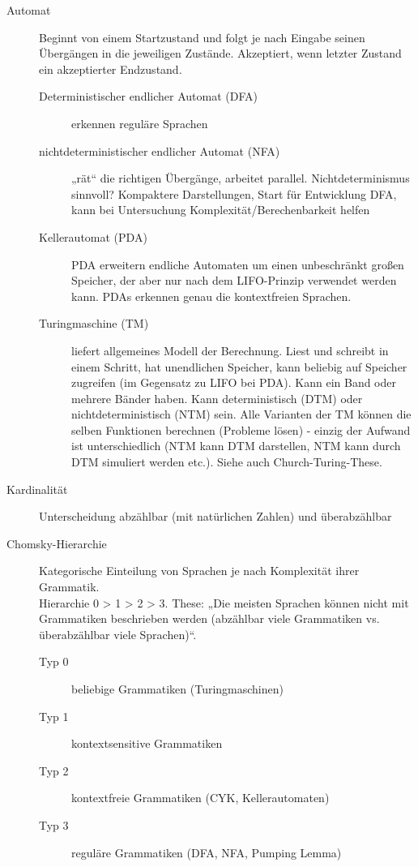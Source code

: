 \begin{description}
    \item[Automat]
        Beginnt von einem Startzustand und folgt je nach Eingabe seinen Übergängen in die jeweiligen Zustände.
        Akzeptiert, wenn letzter Zustand ein akzeptierter Endzustand.
        \begin{description}
            \item[Deterministischer endlicher Automat (DFA)] erkennen reguläre Sprachen 
            \item[nichtdeterministischer endlicher Automat (NFA)] „rät“ die richtigen Übergänge, arbeitet parallel. Nichtdeterminismus sinnvoll? Kompaktere Darstellungen, Start für Entwicklung DFA, kann bei Untersuchung Komplexität/Berechenbarkeit helfen 
            \item[Kellerautomat (PDA)]
                PDA erweitern endliche Automaten um einen unbeschränkt großen Speicher, der aber nur nach dem LIFO-Prinzip verwendet werden
                kann. PDAs erkennen genau die kontextfreien Sprachen. 
            \item[Turingmaschine (TM)]
                liefert allgemeines Modell der Berechnung. Liest und schreibt in einem Schritt, hat unendlichen
                Speicher, kann beliebig auf Speicher zugreifen (im Gegensatz zu LIFO bei PDA).
                Kann ein Band oder mehrere Bänder haben.
                Kann deterministisch (DTM) oder nichtdeterministisch (NTM) sein.
                Alle Varianten der TM können die selben Funktionen berechnen (Probleme lösen) - einzig der Aufwand ist unterschiedlich (NTM kann DTM darstellen, NTM kann durch DTM simuliert werden etc.).
                Siehe auch Church-Turing-These. 
        \end{description}


    \item[Kardinalität] Unterscheidung abzählbar (mit natürlichen Zahlen) und überabzählbar

    \item[Chomsky-Hierarchie]
        Kategorische Einteilung von Sprachen je nach Komplexität ihrer Grammatik. \\
        Hierarchie 0 > 1 > 2 > 3.
        These: „Die meisten Sprachen können nicht mit Grammatiken beschrieben
        werden (abzählbar viele Grammatiken vs. überabzählbar viele Sprachen)“. 
        \begin{description}
            \item[Typ 0] beliebige Grammatiken (Turingmaschinen)
            \item[Typ 1] kontextsensitive Grammatiken
            \item[Typ 2] kontextfreie Grammatiken (CYK, Kellerautomaten)
            \item[Typ 3] reguläre Grammatiken (DFA, NFA, Pumping Lemma)
        \end{description}


\end{description}
